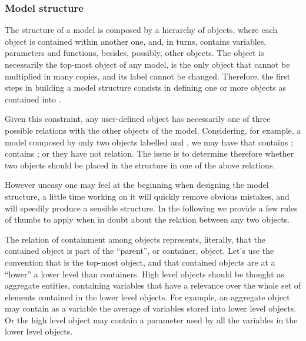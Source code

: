 \documentclass [11pt,a4paper] {book}
\begin{document}
\subsubsection{Model structure}

The structure of a model is composed by a hierarchy of objects, where each object is contained within another one, and, in turns, contains variables, parameters and functions, besides, possibly, other objects. The object  is necessarily the top-most object of any model, is the only object that cannot be multiplied in many copies, and its label cannot be changed. Therefore, the first steps in building a model structure consists in defining one or more objects as contained into .

Given this constraint, any user-defined object has necessarily one of three possible relations with the other objects of the model. Considering, for example, a model composed by only two objects labelled  and , we may have that  contains ;  contains ; or they have not relation. The issue is to determine therefore whether two objects should be placed in the structure in one of the above relations.

However uneasy one may feel at the beginning when designing the model structure, a little time working on it will quickly remove obvious mistakes, and will speedily produce a sensible structure. In the following we provide a few rules of thumbs to apply when in doubt about the relation between any two objects.

The relation of containment among objects represents, literally, that the contained object is part of the ``parent'', or container, object. Let's use the convention that  is the top-most object, and that contained objects are at a ``lower'' a lower level than containers. High level objects should be thought as aggregate entities, containing variables that have a relevance over the whole set of elements contained in the lower level objects. For example, an aggregate object may contain as a variable the average of variables stored into lower level objects. Or the high level object may contain a parameter used by all the variables in the lower level objects.
\end{document}
